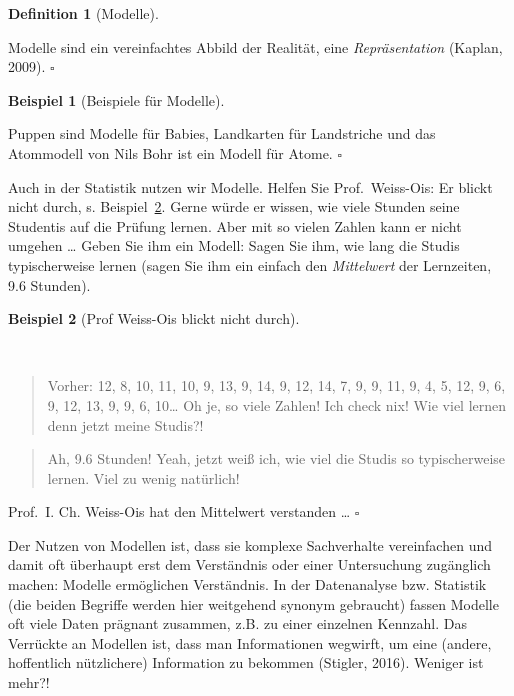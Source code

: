 \documentclass[
  letterpaper,
  twoside,
  open=any]{scrbook}
\theoremstyle{definition}
\theoremstyle{definition}
\newtheorem{example}{Beispiel}[chapter]
\theoremstyle{definition}
\newtheorem{definition}{Definition}[chapter]
\theoremstyle{remark}
\begin{document}
\begin{definition}[Modelle]\protect\hypertarget{def-modelle}{}\label{def-modelle}

Modelle sind ein vereinfachtes Abbild der Realität, eine
\emph{Repräsentation} (Kaplan, 2009). \(\square\)

\end{definition}

\begin{example}[Beispiele für
Modelle]\protect\hypertarget{exm-Modelle}{}\label{exm-Modelle}

Puppen sind Modelle für Babies, Landkarten für Landstriche und das
Atommodell von Nils Bohr ist ein Modell für Atome. \(\square\)

\end{example}

Auch in der Statistik nutzen wir Modelle. Helfen Sie Prof.~Weiss-Ois: Er
blickt nicht durch, s. Beispiel~\ref{exm-weiss-ois}. Gerne würde er
wissen, wie viele Stunden seine Studentis auf die Prüfung lernen. Aber
mit so vielen Zahlen kann er nicht umgehen \ldots{} Geben Sie ihm ein
Modell: Sagen Sie ihm, wie lang die Studis typischerweise lernen (sagen
Sie ihm ein einfach den \emph{Mittelwert} der Lernzeiten, 9.6 Stunden).

\begin{example}[Prof Weiss-Ois blickt nicht
durch]\protect\hypertarget{exm-weiss-ois}{}\label{exm-weiss-ois}

~

\begin{quote}
{} Vorher: 12, 8, 10, 11, 10, 9, 13, 9, 14, 9, 12, 14, 7,
9, 9, 11, 9, 4, 5, 12, 9, 6, 9, 12, 13, 9, 9, 6, 10\ldots{} Oh je, so
viele Zahlen! Ich check nix! Wie viel lernen denn jetzt meine Studis?!
\end{quote}

\begin{quote}
{} Ah, 9.6 Stunden! Yeah, jetzt weiß ich, wie viel die
Studis so typischerweise lernen. Viel zu wenig natürlich!
\end{quote}

Prof.~I. Ch. Weiss-Ois hat den Mittelwert verstanden \ldots{}
\(\square\)

\end{example}

Der Nutzen von Modellen ist, dass sie komplexe Sachverhalte vereinfachen
und damit oft überhaupt erst dem Verständnis oder einer Untersuchung
zugänglich machen: Modelle ermöglichen Verständnis. In der Datenanalyse
bzw. Statistik (die beiden Begriffe werden hier weitgehend synonym
gebraucht) fassen Modelle oft viele Daten prägnant zusammen, z.B. zu
einer einzelnen Kennzahl. Das Verrückte an Modellen ist, dass man
Informationen wegwirft, um eine (andere, hoffentlich nützlichere)
Information zu bekommen (Stigler, 2016). Weniger ist mehr?!
\end{document}
